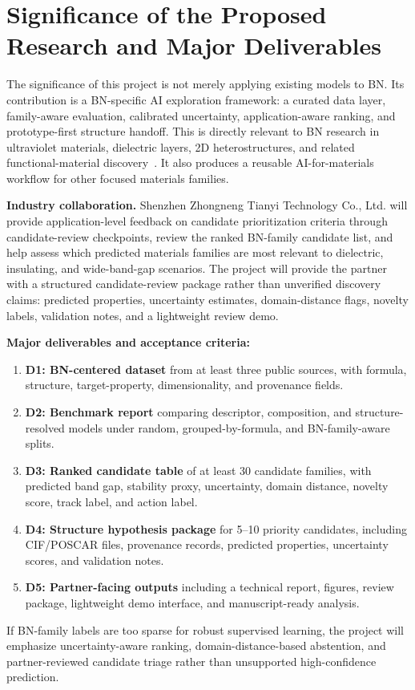 \documentclass[10pt,a4paper]{article}
\begin{document}
\section{Significance of the Proposed Research and Major Deliverables}
The significance of this project is not merely applying existing models to BN. Its contribution is a BN-specific AI exploration framework: a curated data layer, family-aware evaluation, calibrated uncertainty, application-aware ranking, and prototype-first structure handoff. This is directly relevant to BN research in ultraviolet materials, dielectric layers, 2D heterostructures, and related functional-material discovery~\cite{watanabe2004_hbn_uv,cassabois2016_hbn_indirect,dean2010_hbn_graphene}. It also produces a reusable AI-for-materials workflow for other focused materials families.

\textbf{Industry collaboration.}
Shenzhen Zhongneng Tianyi Technology Co., Ltd. will provide application-level feedback on candidate prioritization criteria through candidate-review checkpoints, review the ranked BN-family candidate list, and help assess which predicted materials families are most relevant to dielectric, insulating, and wide-band-gap scenarios. The project will provide the partner with a structured candidate-review package rather than unverified discovery claims: predicted properties, uncertainty estimates, domain-distance flags, novelty labels, validation notes, and a lightweight review demo.

\textbf{Major deliverables and acceptance criteria:}
\begin{enumerate}[leftmargin=*]
  \item \textbf{D1: BN-centered dataset} from at least three public sources, with formula, structure, target-property, dimensionality, and provenance fields.
  \item \textbf{D2: Benchmark report} comparing descriptor, composition, and structure-resolved models under random, grouped-by-formula, and BN-family-aware splits.
  \item \textbf{D3: Ranked candidate table} of at least 30 candidate families, with predicted band gap, stability proxy, uncertainty, domain distance, novelty score, track label, and action label.
  \item \textbf{D4: Structure hypothesis package} for 5--10 priority candidates, including CIF/POSCAR files, provenance records, predicted properties, uncertainty scores, and validation notes.
  \item \textbf{D5: Partner-facing outputs} including a technical report, figures, review package, lightweight demo interface, and manuscript-ready analysis.
\end{enumerate}
If BN-family labels are too sparse for robust supervised learning, the project will emphasize uncertainty-aware ranking, domain-distance-based abstention, and partner-reviewed candidate triage rather than unsupported high-confidence prediction.
\end{document}
